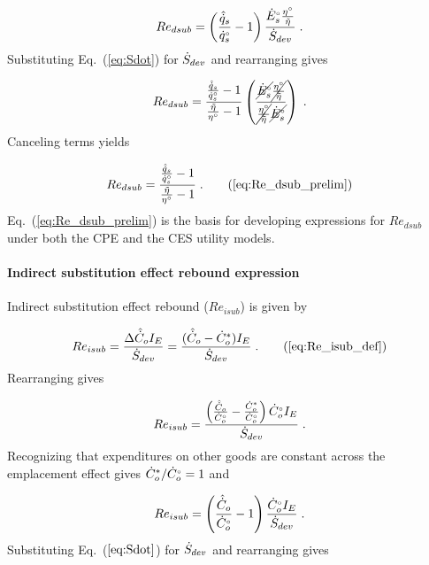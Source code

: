\begin{equation}
  Re_{dsub} = \left( \frac{\hat{\dot{q}}_s}{{}{\dot{q}}^{\scriptscriptstyle \circ}_s} - 1  \right)
              \frac{{}{\dot{E}}^{\scriptscriptstyle \circ}_s \frac{{}{\eta}^{\scriptscriptstyle \circ}}{\tilde{\eta}}}{\dot{S}_{dev}} \; .
\end{equation}
%
Substituting Eq.~(\ref{eq:Sdot}) for $\dot{S}_{dev}$ and rearranging gives

\begin{equation}
  Re_{dsub} = \frac{\frac{\hat{\dot{q}}_s}{{}{\dot{q}}^{\scriptscriptstyle \circ}_s} - 1}{\frac{\tilde{\eta}}{{}{\eta}^{\scriptscriptstyle \circ}} - 1}
              \left( \frac{\cancel{{}{\dot{E}}^{\scriptscriptstyle \circ}_s} \cancel{\frac{{}{\eta}^{\scriptscriptstyle \circ}}{\tilde{\eta}}}    }{  \cancel{\frac{{}{\eta}^{\scriptscriptstyle \circ}}{\tilde{\eta}}}    \cancel{{}{\dot{E}}^{\scriptscriptstyle \circ}_s}} \right) \; .
\end{equation}
%
Canceling terms yields

\begin{equation}
  Re_{dsub} = \frac{\frac{\rasub{q}_s}{\rbempl{q}_s} - 1}{\frac{\amacro{\eta}}{\bempl{\eta}} - 1} \; .
                                                               \tag{\ref{eq:Re_dsub_prelim}}
\end{equation}
%
Eq.~(\ref{eq:Re_dsub_prelim}) is the basis for developing 
expressions for $Re_{dsub}$ 
under both the CPE and the CES utility models.


\paragraph{Indirect substitution effect rebound expression}
\label{sec:Reisub_expression}

Indirect substitution effect rebound ($Re_{isub}$) is given by

\begin{equation}
  Re_{isub} = \frac{\Delta \rasub{C}_o I_E}{\Sdot} = \frac{(\rasub{C}_o - \rbsub{C}_{o}) I_E}{\Sdot} \; . \tag{\ref{eq:Re_isub_def}}
\end{equation}
%
Rearranging gives

\begin{equation}
  Re_{isub} = \frac{\left(\frac{\hat{\dot{C}}_o}{{}{\dot{C}}^{\scriptscriptstyle \circ}_o} - \frac{{\dot{C}}^*_o}{{}{\dot{C}}^{\scriptscriptstyle \circ}_o}  \right) {}{\dot{C}}^{\scriptscriptstyle \circ}_o I_E }{\dot{S}_{dev}} \; .
\end{equation}
%
Recognizing that expenditures on other goods are constant across the emplacement effect gives
${\dot{C}}^*_o/{}{\dot{C}}^{\scriptscriptstyle \circ}_o = 1$ and

\begin{equation}
  Re_{isub} = \left(\frac{\hat{\dot{C}}_o}{{}{\dot{C}}^{\scriptscriptstyle \circ}_o} - 1  \right) \frac{{}{\dot{C}}^{\scriptscriptstyle \circ}_o I_E }{\dot{S}_{dev}} \; .
\end{equation}
%
Substituting Eq.~($\ref{eq:Sdot}$) for $\dot{S}_{dev}$ and rearranging gives

